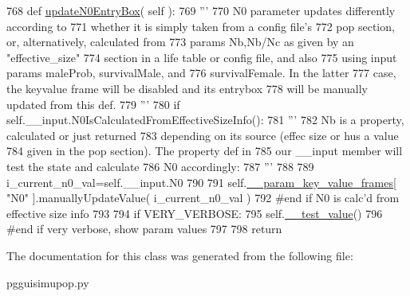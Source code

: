 \begin{DoxyCode}
768     \textcolor{keyword}{def }\hyperlink{classnegui_1_1pgguisimupop_1_1PGGuiSimuPop_ac193cf44f5e4f1e5b146a43e9563d7b0}{updateN0EntryBox}( self ):
769         \textcolor{stringliteral}{'''}
770 \textcolor{stringliteral}{        N0 parameter updates differently according to}
771 \textcolor{stringliteral}{        whether it is simply taken from a config file's}
772 \textcolor{stringliteral}{        pop section, or, alternatively, calculated from}
773 \textcolor{stringliteral}{        params Nb,Nb/Nc as given by an "effective\_size"}
774 \textcolor{stringliteral}{        section in a life table or config file, and also}
775 \textcolor{stringliteral}{        using input params maleProb, survivalMale, and}
776 \textcolor{stringliteral}{        survivalFemale.  In the latter}
777 \textcolor{stringliteral}{        case, the keyvalue frame will be disabled and its entrybox}
778 \textcolor{stringliteral}{        will be manually updated from this def.  }
779 \textcolor{stringliteral}{        '''}
780         \textcolor{keywordflow}{if} self.\_\_input.N0IsCalculatedFromEffectiveSizeInfo():
781             \textcolor{stringliteral}{'''}
782 \textcolor{stringliteral}{            Nb is a property, calculated or just returned}
783 \textcolor{stringliteral}{            depending on its source (effec size or hus a value}
784 \textcolor{stringliteral}{            given in the pop section). The property def in}
785 \textcolor{stringliteral}{            our \_\_input member will test the state and calculate}
786 \textcolor{stringliteral}{            N0 accordingly:}
787 \textcolor{stringliteral}{            '''}
788 
789             i\_current\_n0\_val=self.\_\_input.N0
790 
791             self.\hyperlink{classnegui_1_1pgguisimupop_1_1PGGuiSimuPop_a272523ce4bad4d1073c506e858c59996}{\_\_param\_key\_value\_frames}[ \textcolor{stringliteral}{"N0"} ].manuallyUpdateValue( 
      i\_current\_n0\_val )
792         \textcolor{comment}{#end if N0 is calc'd from effective size info}
793 
794         \textcolor{keywordflow}{if} VERY\_VERBOSE:
795             self.\hyperlink{classnegui_1_1pgguisimupop_1_1PGGuiSimuPop_a1a916d4c19afe08b2c7772d099c71f3f}{\_\_test\_value}()
796         \textcolor{comment}{#end if very verbose, show param values}
797 
798         \textcolor{keywordflow}{return}
\end{DoxyCode}


The documentation for this class was generated from the following file\+:\begin{DoxyCompactItemize}
\item 
pgguisimupop.\+py\end{DoxyCompactItemize}
